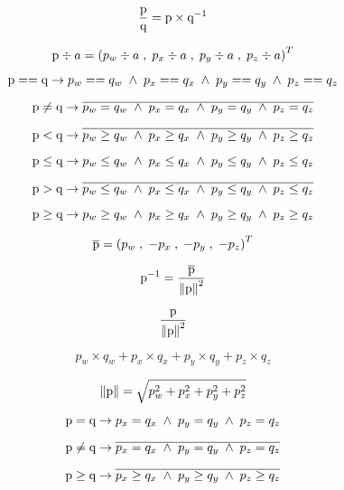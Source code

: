 \documentclass{article}
\begin{document}
\[ \frac{ \mbox{\boldmath p} }{ \mbox{\boldmath q} } = \mbox{\boldmath p} \times \mbox{\boldmath q}^{-1} \]
\pagebreak

\[ \mbox{\boldmath p} \div a = \left( p_w \div a \;,\; p_x \div a \;,\; p_y \div a \;,\; p_z \div a \right)^T \]
\pagebreak

\[ \mbox{\boldmath p} == \mbox{\boldmath q} \rightarrow p_w == q_w \; \wedge \; p_x == q_x \; \wedge \; p_y == q_y \; \wedge \; p_z == q_z \]
\pagebreak

\[ \mbox{\boldmath p} \neq \mbox{\boldmath q} \rightarrow \overline{ p_w = q_w \; \wedge \; p_x = q_x \; \wedge \; p_y = q_y \; \wedge \; p_z = q_z } \]
\pagebreak

\[ \mbox{\boldmath p} < \mbox{\boldmath q} \rightarrow \overline{ p_w \ge q_w \; \wedge \; p_x \ge q_x \; \wedge \; p_y \ge q_y \; \wedge \; p_z \ge q_z } \]
\pagebreak

\[ \mbox{\boldmath p} \le \mbox{\boldmath q} \rightarrow p_w \le q_w \; \wedge \; p_x \le q_x \; \wedge \; p_y \le q_y \; \wedge \; p_z \le q_z \]
\pagebreak

\[ \mbox{\boldmath p} > \mbox{\boldmath q} \rightarrow \overline{ p_w \le q_w \; \wedge \; p_x \le q_x \; \wedge \; p_y \le q_y \; \wedge \; p_z \le q_z } \]
\pagebreak

\[ \mbox{\boldmath p} \ge \mbox{\boldmath q} \rightarrow p_w \ge q_w \; \wedge \; p_x \ge q_x \; \wedge \; p_y \ge q_y \; \wedge \; p_z \ge q_z \]
\pagebreak

\[ \overline{ \mbox{\boldmath p} } = \left( p_w \;,\; -p_x \;,\; -p_y \;,\; -p_z \right)^T \]
\pagebreak

\[ \mbox{\boldmath p}^{-1} = \frac{ \overline{ \mbox{\boldmath p} } }{ \left\| \mbox{\boldmath p} \right\|^2 } \]
\pagebreak

\[ \frac{ \mbox{\boldmath p} }{ \left\| \mbox{\boldmath p} \right\|^2 } \]
\pagebreak

\[ p_w \times q_w + p_x \times q_x + p_y \times q_y + p_z \times q_z \]
\pagebreak

\[ \left\| \mbox{\boldmath p} \right\| = \sqrt{ p_w^2 + p_x^2 + p_y^2 + p_z^2 } \]
\pagebreak

\[ \mbox{\boldmath p} = \mbox{\boldmath q} \rightarrow p_x = q_x \; \wedge \; p_y = q_y \; \wedge \; p_z = q_z \]
\pagebreak

\[ \mbox{\boldmath p} \neq \mbox{\boldmath q} \rightarrow \overline{ p_x = q_x \; \wedge \; p_y = q_y \; \wedge \; p_z = q_z} \]
\pagebreak

\[ \mbox{\boldmath p} \ge \mbox{\boldmath q} \rightarrow \overline{ p_x \ge q_x \; \wedge \; p_y \ge q_y \; \wedge \; p_z \ge q_z } \]
\pagebreak
\end{document}
